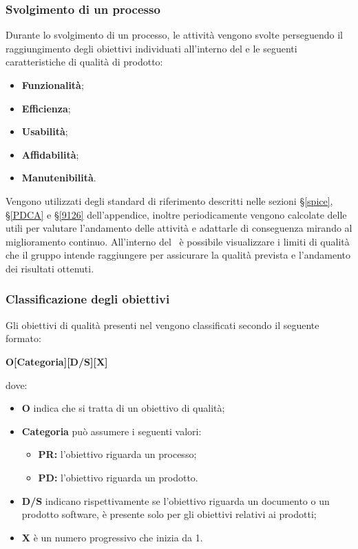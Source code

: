 \subsubsection{Svolgimento di un processo}\label{QualitàProcesso}Durante lo svolgimento di un processo, le attività vengono svolte perseguendo il raggiungimento degli obiettivi individuati all'interno del  e le seguenti caratteristiche di qualità di prodotto:
\begin{itemize}
		\item \textbf{Funzionalità};
		\item \textbf{Efficienza};
		\item \textbf{Usabilità};
		\item \textbf{Affidabilità};
		\item \textbf{Manutenibilità}.
\end{itemize}
Vengono utilizzati degli standard di riferimento descritti nelle sezioni \S\ref{spice}, \S\ref{PDCA} e \S\ref{9126} dell'appendice, inoltre periodicamente vengono calcolate delle  utili per valutare l'andamento delle attività e adattarle di conseguenza mirando al miglioramento continuo. All'interno del \PdQ\ è possibile visualizzare i limiti di qualità che il gruppo intende raggiungere per assicurare la qualità prevista e l'andamento dei risultati ottenuti.

\subsubsection{Classificazione degli obiettivi}
Gli obiettivi di qualità presenti nel  vengono classificati secondo il seguente formato:
\begin{center}
	\textbf{O[Categoria][D/S][X]}
\end{center}
dove: 
\begin{itemize}
	\item \textbf{O} indica che si tratta di un obiettivo di qualità;\\
	\item \textbf{Categoria} può assumere i seguenti valori:
	\begin{itemize}
		\item \textbf{PR:} l'obiettivo riguarda un processo;
		\item \textbf{PD:} l'obiettivo riguarda un prodotto.
	\end{itemize}
	\item \textbf{D/S} indicano rispettivamente se l'obiettivo riguarda un documento o un prodotto software, è presente solo per gli obiettivi relativi ai prodotti;
	\item \textbf{X} è un numero progressivo che inizia da 1.
\end{itemize}

